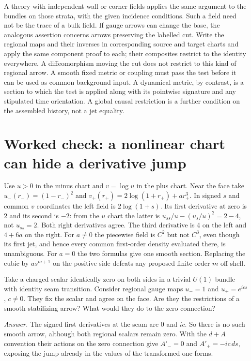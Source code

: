 A theory with independent wall or corner fields applies the same argument to the bundles on those strata, with the given incidence conditions. Such a field need not be the trace of a bulk field. If gauge arrows can change the base, the analogous assertion concerns arrows preserving the labelled cut. Write the regional maps and their inverses in corresponding source and target charts and apply the same component proof to each; their composites restrict to the identity everywhere. A diffeomorphism moving the cut does not restrict to this kind of regional arrow. A smooth fixed metric or coupling must pass the test before it can be used as common background input. A dynamical metric, by contrast, is a section to which the test is applied along with its pointwise signature and any stipulated time orientation. A global causal restriction is a further condition on the assembled history, not a jet equality.

\section{Worked check: a nonlinear chart can hide a derivative jump}

Use $u>0$ in the minus chart and $v=\log u$ in the plus chart. Near the face take $u_-(r_-)=(1-r_-)^2$ and $v_+(r_+)=2\log(1+r_+)+a r_+^3$. In signed $s$ and common $v$ coordinates the left field is $2\log(1+s)$. Its first derivative at zero is $2$ and its second is $-2$: from the $u$ chart the latter is $u_{ss}/u-(u_s/u)^2=2-4$, not $u_{ss}=2$. Both right derivatives agree. The third derivative is $4$ on the left and $4+6a$ on the right. For $a\ne0$ the piecewise field is $C^2$ but not $C^3$, even though its first jet, and hence every common first-order density evaluated there, is unambiguous. For $a=0$ the two formulas give one smooth section. Replacing the cubic by $a s^{m+1}$ on the positive side defeats any proposed finite order $m$ off shell.

\begin{exercise}
Take a charged scalar identically zero on both sides in a trivial $U(1)$ bundle with identity seam transition. Consider regional gauge maps $u_-=1$ and $u_+=e^{i c s}$, $c\ne0$. They fix the scalar and agree on the face. Are they the restrictions of a smooth stabilizing arrow? What would they do to the zero connection?

\emph{Answer.} The signed first derivatives at the seam are $0$ and $ic$. So there is no such smooth arrow, although both regional scalars remain zero. With the $d+A$ convention their actions on the zero connection give $A'_-=0$ and $A'_+=-ic\,ds$, exposing the jump already in the values of the transformed one-forms.
\end{exercise}
